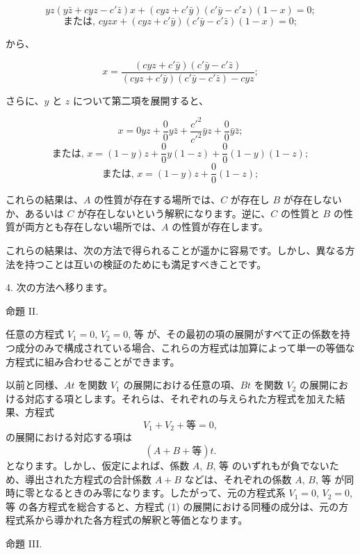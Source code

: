 \documentclass[a4paper,11pt,openany]{ltjsbook}
\begin{document}
\[
yz(y\bar{z} + cyz - c'\bar{z}) x + (cyz + c'\bar{y})(c'\bar{y} - c'{z})(1 - x) = 0;
\]
\[
\textrm{または, } cyzx + (cyz + c'\bar{y})(c'\bar{y} - c'\bar{z})(1 - x) = 0;
\]

から、

\[
x = \frac{(cyz + c'\bar{y})(c'\bar{y} - c'\bar{z})}{(cyz + c'\bar{y})(c'\bar{y} - c'\bar{z}) - cyz};
\]

さらに、$y$ と $z$ について第二項を展開すると、

\[
x = 0yz + \frac{0}{0} y\bar{z} + \frac{c'^2}{c'^2}\bar{y}z + \frac{0}{0} \bar{y}\bar{z};
\]
\[
\textrm{または, } x = (1 - y)z + \frac{0}{0} y(1 - z) + \frac{0}{0}(1 - y)(1 - z);
\]
\[
\textrm{または, } x = (1 - y)z + \frac{0}{0}(1 - z);
\]

これらの結果は、$A$ の性質が存在する場所では、$C$ が存在し $B$ が存在しないか、あるいは $C$ が存在しないという解釈になります。逆に、$C$ の性質と $B$ の性質が両方とも存在しない場所では、$A$ の性質が存在します。

これらの結果は、次の方法で得られることが遥かに容易です。しかし、異なる方法を持つことは互いの検証のためにも満足すべきことです。

4. 次の方法へ移ります。

\begin{center}
\textsc{命題 II.}
\end{center}

任意の方程式 $V_1 = 0$, $V_2 = 0$, $等$ が、その最初の項の展開がすべて正の係数を持つ成分のみで構成されている場合、これらの方程式は加算によって単一の等価な方程式に組み合わせることができます。

以前と同様、$At$ を関数 $V_1$ の展開における任意の項、$Bt$ を関数 $V_2$ の展開における対応する項とします。それらは、それぞれの与えられた方程式を加えた結果、方程式
\setcounter{equation}{0}
\begin{equation}
V_1 + V_2 + \textrm{等} = 0,
\end{equation}
の展開における対応する項は
\[
\left(A+B+\textrm{等}\right)t.
\]
となります。しかし、仮定によれば、係数 $A$, $B$, 等 のいずれもが負でないため、導出された方程式の合計係数 $A + B$ などは、それぞれの係数 $A$, $B$, 等 が同時に零となるときのみ零になります。したがって、元の方程式系 $V_1=0$, $V_2=0$, 等 の各方程式を総合すると、方程式 (1) の展開における同種の成分は、元の方程式系から導かれた各方程式の解釈と等価となります。

\begin{center}
\textsc{命題 III.}
\end{center}
\end{document}

